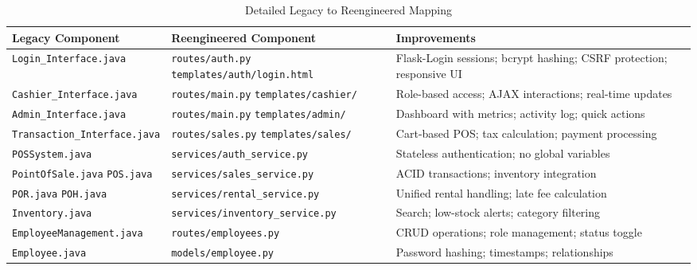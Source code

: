 \begin{table}[h]
  \centering
  \caption{Detailed Legacy to Reengineered Mapping}
  \begin{tabular}{p{3.5cm} p{4cm} p{5.5cm}}
    \toprule
    \textbf{Legacy Component} & \textbf{Reengineered Component} & \textbf{Improvements} \\
    \midrule
    \texttt{Login\_Interface.java} &
      \texttt{routes/auth.py} \newline \texttt{templates/auth/login.html} &
      Flask-Login sessions; bcrypt hashing; CSRF protection; responsive UI \\
    \midrule
    \texttt{Cashier\_Interface.java} &
      \texttt{routes/main.py} \newline \texttt{templates/cashier/} &
      Role-based access; AJAX interactions; real-time updates \\
    \midrule
    \texttt{Admin\_Interface.java} &
      \texttt{routes/main.py} \newline \texttt{templates/admin/} &
      Dashboard with metrics; activity log; quick actions \\
    \midrule
    \texttt{Transaction\_Interface.java} &
      \texttt{routes/sales.py} \newline \texttt{templates/sales/} &
      Cart-based POS; tax calculation; payment processing \\
    \midrule
    \texttt{POSSystem.java} &
      \texttt{services/auth\_service.py} &
      Stateless authentication; no global variables \\
    \midrule
    \texttt{PointOfSale.java} \newline \texttt{POS.java} &
      \texttt{services/sales\_service.py} &
      ACID transactions; inventory integration \\
    \midrule
    \texttt{POR.java} \newline \texttt{POH.java} &
      \texttt{services/rental\_service.py} &
      Unified rental handling; late fee calculation \\
    \midrule
    \texttt{Inventory.java} &
      \texttt{services/inventory\_service.py} &
      Search; low-stock alerts; category filtering \\
    \midrule
    \texttt{EmployeeManagement.java} &
      \texttt{routes/employees.py} &
      CRUD operations; role management; status toggle \\
    \midrule
    \texttt{Employee.java} &
      \texttt{models/employee.py} &
      Password hashing; timestamps; relationships \\

\end{tabular}
\end{table}
